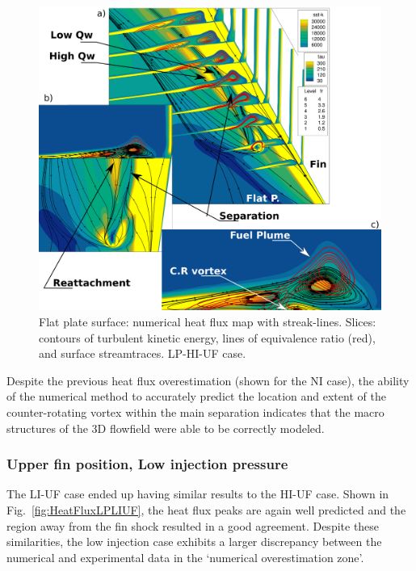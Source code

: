 \documentclass{AIAA}
\begin{document}
\begin{figure}[!h]
\center
\includegraphics[trim = 0mm 0mm 0mm 0mm, clip, width=0.95\columnwidth,valign=t]{Figures/Flowfield_Experimental_Vred.pdf}
\caption{Flat plate surface: numerical heat flux map with streak-lines. Slices: contours of turbulent kinetic energy, lines of equivalence ratio (red), and surface streamtraces. LP-HI-UF case.}
\label{fig:Exper_Flowf}
\end{figure} 


Despite the previous heat flux overestimation (shown for the NI case), the ability of the numerical method to accurately predict the location and extent of the counter-rotating vortex within the main separation indicates that the macro structures of the 3D flowfield were able to be correctly modeled.


\subsubsection{Upper fin position, Low injection pressure}

The LI-UF case ended up having similar results to the HI-UF case. 
Shown in Fig.~\ref{fig:HeatFluxLPLIUF}, the heat flux peaks are again well predicted and the region away from the fin shock resulted in a good agreement.
Despite these similarities, the low injection case exhibits a larger discrepancy between the numerical and experimental data in the `numerical overestimation zone'. 
\end{document}
